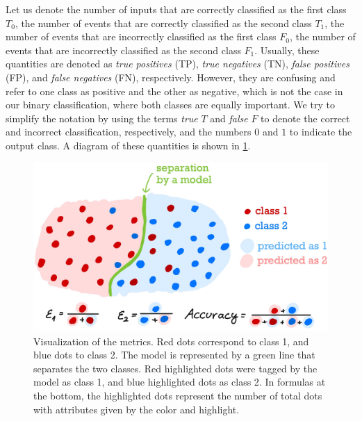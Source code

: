 Let us denote the number of inputs that are correctly classified as the first class $T_0$, the number of events that are correctly classified as the second class $T_1$, the number of events that are incorrectly classified as the first class $F_0$, the number of events that are incorrectly classified as the second class $F_1$.
Usually, these quantities are denoted as \emph{true positives} (TP), \emph{true negatives} (TN), \emph{false positives} (FP), and \emph{false negatives} (FN), respectively.
However, they are confusing and refer to one class as positive and the other as negative, which is not the case in our binary classification, where both classes are equally important.
We try to simplify the notation by using the terms \emph{true} $T$ and \emph{false} $F$ to denote the correct and incorrect classification, respectively, and the numbers $0$ and $1$ to indicate the output class.
A diagram of these quantities is shown in \cref{fig:metrics}.
\begin{figure}[htb]
    \centering
    \includegraphics[width=1\linewidth]{src/img/metrics.jpg}
    \caption{Visualization of the metrics. Red dots correspond to class 1, and blue dots to class 2. The model is represented by a green line that separates the two classes. Red highlighted dots were tagged by the model as class 1, and blue highlighted dots as class 2. In formulas at the bottom, the highlighted dots represent the number of total dots with attributes given by the color and highlight.}
    \label{fig:metrics}
\end{figure}

